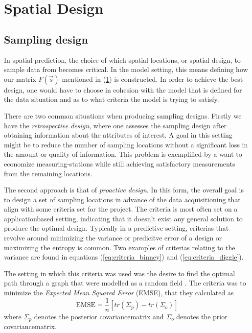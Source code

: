 \section{Spatial Design}
\subsection{Sampling design} 
\label{sec:sampling_design}
In spatial prediction, the choice of which spatial locations, or spatial design, to sample data from becomes critical. In the model setting, this means defining how our matrix $F(\vec{s})$ mentioned in (\ref{}) is constructed. In order to achieve the best design, one would have to choose in cohesion with the model that is defined for the data situation and as to what criteria the model is trying to satisfy. 

There are two common situations when producing sampling designs. Firstly we have the \textit{retrospective design}, where one assesses the sampling design after obtaining information about the attributes of interest. A goal in this setting might be to reduce the number of sampling locations without a significant loss in the amount or quality of information. This problem is exemplified by a want to economize measuring-stations while still achieving satisfactory measurements from the remaining locations.  

The second approach is that of \textit{proactive design}. In this form, the overall goal is to design a set of sampling locations in advance of the data acquisitioning that align with some criteria set for the project. The criteria is most often set on a applicationbased setting, indicating that it doesn't exist any general solution to produce the optimal design. Typically in a predictive setting, criterias that revolve around minimizing the variance or predicitve error of a design or maximizing the entropy is common. Two examples of criterias relating to the variance are found in equations (\ref{eq:criteria_binney}) and (\ref{eq:criteria_diggle}). 


The setting in which this criteria was used was the desire to find the optimal path through a graph that were modelled as a random field \cite{BinneyEtAl}. The criteria was to minimize the \textit{Expected Mean Squared Error} (EMSE), that they calculated as 
\begin{equation} \label{eq:criteria_binney}
\text{EMSE} = \frac{1}{n} [tr(\Sigma_p) - tr(\Sigma_o)]
\end{equation}
where $\Sigma_p$ denotes the posterior covariancematrix and $\Sigma_o$ denotes the prior covariancematrix.

